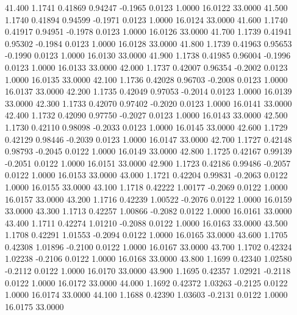   41.400   1.1741   0.41869   0.94247  -0.1965   0.0123   1.0000  16.0122  33.0000
  41.500   1.1740   0.41894   0.94599  -0.1971   0.0123   1.0000  16.0124  33.0000
  41.600   1.1740   0.41917   0.94951  -0.1978   0.0123   1.0000  16.0126  33.0000
  41.700   1.1739   0.41941   0.95302  -0.1984   0.0123   1.0000  16.0128  33.0000
  41.800   1.1739   0.41963   0.95653  -0.1990   0.0123   1.0000  16.0130  33.0000
  41.900   1.1738   0.41985   0.96004  -0.1996   0.0123   1.0000  16.0133  33.0000
  42.000   1.1737   0.42007   0.96354  -0.2002   0.0123   1.0000  16.0135  33.0000
  42.100   1.1736   0.42028   0.96703  -0.2008   0.0123   1.0000  16.0137  33.0000
  42.200   1.1735   0.42049   0.97053  -0.2014   0.0123   1.0000  16.0139  33.0000
  42.300   1.1733   0.42070   0.97402  -0.2020   0.0123   1.0000  16.0141  33.0000
  42.400   1.1732   0.42090   0.97750  -0.2027   0.0123   1.0000  16.0143  33.0000
  42.500   1.1730   0.42110   0.98098  -0.2033   0.0123   1.0000  16.0145  33.0000
  42.600   1.1729   0.42129   0.98446  -0.2039   0.0123   1.0000  16.0147  33.0000
  42.700   1.1727   0.42148   0.98793  -0.2045   0.0122   1.0000  16.0149  33.0000
  42.800   1.1725   0.42167   0.99139  -0.2051   0.0122   1.0000  16.0151  33.0000
  42.900   1.1723   0.42186   0.99486  -0.2057   0.0122   1.0000  16.0153  33.0000
  43.000   1.1721   0.42204   0.99831  -0.2063   0.0122   1.0000  16.0155  33.0000
  43.100   1.1718   0.42222   1.00177  -0.2069   0.0122   1.0000  16.0157  33.0000
  43.200   1.1716   0.42239   1.00522  -0.2076   0.0122   1.0000  16.0159  33.0000
  43.300   1.1713   0.42257   1.00866  -0.2082   0.0122   1.0000  16.0161  33.0000
  43.400   1.1711   0.42274   1.01210  -0.2088   0.0122   1.0000  16.0163  33.0000
  43.500   1.1708   0.42291   1.01553  -0.2094   0.0122   1.0000  16.0165  33.0000
  43.600   1.1705   0.42308   1.01896  -0.2100   0.0122   1.0000  16.0167  33.0000
  43.700   1.1702   0.42324   1.02238  -0.2106   0.0122   1.0000  16.0168  33.0000
  43.800   1.1699   0.42340   1.02580  -0.2112   0.0122   1.0000  16.0170  33.0000
  43.900   1.1695   0.42357   1.02921  -0.2118   0.0122   1.0000  16.0172  33.0000
  44.000   1.1692   0.42372   1.03263  -0.2125   0.0122   1.0000  16.0174  33.0000
  44.100   1.1688   0.42390   1.03603  -0.2131   0.0122   1.0000  16.0175  33.0000
